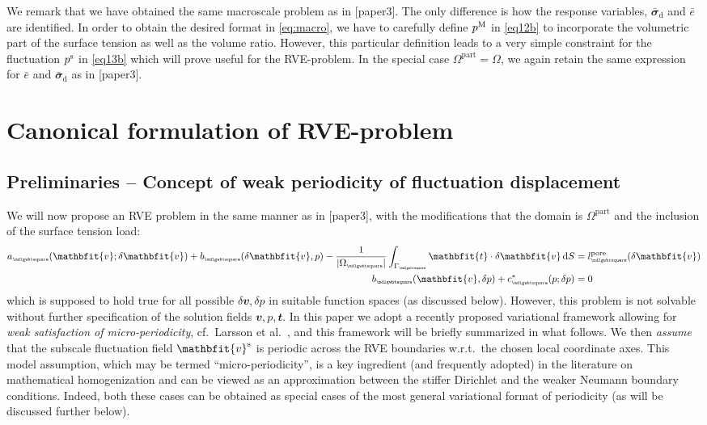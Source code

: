 \documentclass[12pt,a4paper]{article}
\renewcommand{\ta}[1]{\mathbfit{#1}}
\renewcommand{\ts}[1]{\mathbfit{#1}}
\renewcommand{\Box}{\mdlgwhtsquare}
\renewcommand{\dev}{\mathrm{d}}
\newcommand{\volume}{|\Omega_\rve|}
\newcommand{\pore}{\mathrm{pore}}
\newcommand{\particle}{\mathrm{part}}
\newcommand{\rve}{
  {\mathchoice
   {\mbox{\scalebox{0.67}{$\Box$}}}
   {\mbox{\scalebox{0.67}{$\Box$}}}
   {\mbox{\scalebox{0.5}{$\Box$}}}
   {\mbox{\scalebox{0.375}{$\Box$}}}
  }
}
\begin{document}
We remark that we have obtained the same macroscale problem as in [paper3].
The only difference is how the response variables, $\bar{\ts\sigma}_\dev$ and $\bar{e}$ are identified.
In order to obtain the desired format in \eqref{eq:macro}, we have to carefully define $p^{\mathrm{M}}$ in \eqref{eq12b} to incorporate the volumetric part of the surface tension as well as the volume ratio. However, this particular definition leads to a very simple constraint for the fluctuation $p^{\mathrm{s}}$ in \eqref{eq13b} which will prove useful for the RVE-problem.
In the special case $\Omega^\particle = \Omega$, we again retain the same expression for $\bar{e}$ and $\bar{\ts\sigma}_\dev$ as in [paper3].



\section{Canonical formulation of RVE-problem}

\subsection{Preliminaries -- Concept of weak periodicity of fluctuation displacement}

We will now propose an RVE problem in the same manner as in [paper3], with the modifications that the domain is $\Omega^\particle$ and the inclusion of the surface tension load:
\begin{subequations}
\begin{align}
    a_\rve(\ta v;\delta\ta v) + b_\rve(\delta\ta v,p) - \frac{1}{\volume}\int_{\Gamma_\rve} \ta{t}\cdot\delta\ta v \dif S &= l_\rve^\pore(\delta\ta v)
\label{eq19a} \\
    b_\rve(\ta v,\delta p) + c^*_\rve(p;\delta p) &= 0
\label{eq19b}
\end{align}
\end{subequations}
which is supposed to hold true for all possible $\delta\ta v, \delta p$ in suitable function spaces (as discussed below).
However, this problem is not solvable without further specification of the solution fields $\ta v, p, \ta{t}$.
In this paper we adopt a recently proposed variational framework allowing for \emph{weak satisfaction of micro-periodicity}, cf.\  Larsson et al.\ \cite{larsson_computational_2011}, and this framework will be briefly summarized in what follows.
We then \emph{assume} that the subscale fluctuation field $\ta v^\fluct$ is periodic across the RVE boundaries w.r.t.\ the chosen local coordinate axes.
This model assumption, which may be termed ``micro-periodicity'', is a key ingredient (and frequently adopted) in the literature on mathematical homogenization and can be viewed as an approximation between the stiffer Dirichlet and the weaker Neumann boundary conditions.
Indeed, both these cases can be obtained as special cases of the most general variational format of periodicity (as will be discussed further below).
\end{document}
